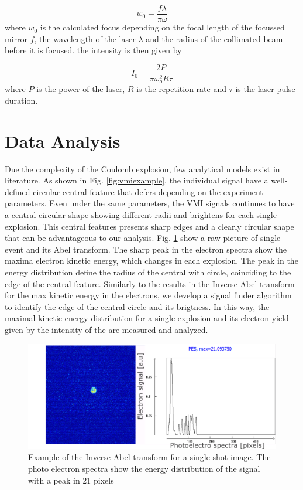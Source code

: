 \begin{equation}
w_{0}=\dfrac{f\lambda}{\pi \omega}
\end{equation}
 where $w_{0}$ is the calculated focus depending on the focal length of the focussed mirror $f$, the wavelength of the laser $\lambda$ and the radius of the collimated beam before it is focused.
the intensity is then given by

\begin{equation}
I_{0}=\dfrac{2P}{\pi \omega_{o}^{2}R \tau}
\end{equation} 
 where $P$ is the power of the laser, $R$ is the repetition rate and $\tau$ is the laser pulse duration.




\section{Data Analysis}

Due the complexity of the Coulomb explosion, few analytical models exist in literature. As shown in Fig. \ref{fig:vmiexample}, the individual signal have a well-defined circular central feature that defers depending on the experiment parameters. Even under the same parameters, the VMI signals continues to have a central circular shape showing different radii and brightens for each single explosion. This central features presents sharp edges and a clearly circular shape that can be advantageous to our analysis. 
Fig. \ref{fig:abeltransf} show a raw picture of single event and its Abel transform. The sharp peak in the electron spectra show the maxima electron kinetic energy, which changes in each explosion. The peak in the energy distribution define the radius of the central with circle, coinciding to the edge of the central feature. Similarly to the results in the Inverse Abel transform for the max kinetic energy in the electrons, we develop a signal finder algorithm to identify the edge of the central circle and its brigtness. In this way, the maximal kinetic energy distribution for a single explosion and its electron yield given by the intensity of the are measured and analyzed.
 
\begin{figure}[h!]
 \centering
 \includegraphics[width=12 cm]{../Images/abel inverse transform.png}
 \caption[Abel inverse transform example]{Example of the Inverse Abel transform for a single shot image. The photo electron spectra show the energy distribution of the signal with a peak in 21 pixels}
 \label{fig:abeltransf}
 \end{figure}

